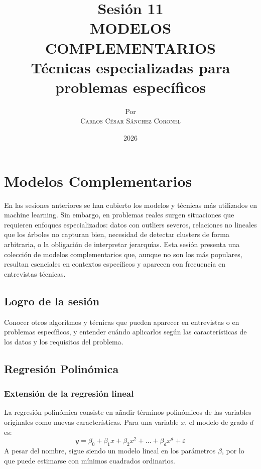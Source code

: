 \documentclass[12pt,a4paper,openany,oneside]{book}
\title{
    \textbf{Sesión 11} \\ 
    \Huge \textbf{MODELOS COMPLEMENTARIOS} \\
    \Large Técnicas especializadas para problemas específicos
}
\author{
    \small Por \\ \vspace{0.2cm}
    \Large \textsc{Carlos César Sánchez Coronel}
}
\date{2026}
\begin{document}
\maketitle
\tableofcontents
{}

\chapter{Modelos Complementarios}

En las sesiones anteriores se han cubierto los modelos y técnicas más utilizados en machine learning. Sin embargo, en problemas reales surgen situaciones que requieren enfoques especializados: datos con outliers severos, relaciones no lineales que los árboles no capturan bien, necesidad de detectar clusters de forma arbitraria, o la obligación de interpretar jerarquías. Esta sesión presenta una colección de modelos complementarios que, aunque no son los más populares, resultan esenciales en contextos específicos y aparecen con frecuencia en entrevistas técnicas.

\section{Logro de la sesión}
Conocer otros algoritmos y técnicas que pueden aparecer en entrevistas o en problemas específicos, y entender cuándo aplicarlos según las características de los datos y los requisitos del problema.

\section{Regresión Polinómica}

\subsection{Extensión de la regresión lineal}
La regresión polinómica consiste en añadir términos polinómicos de las variables originales como nuevas características. Para una variable \(x\), el modelo de grado \(d\) es:
\[
y = \beta_0 + \beta_1 x + \beta_2 x^2 + \dots + \beta_d x^d + \varepsilon
\]
A pesar del nombre, sigue siendo un modelo lineal en los parámetros \(\beta\), por lo que puede estimarse con mínimos cuadrados ordinarios.
\end{document}
